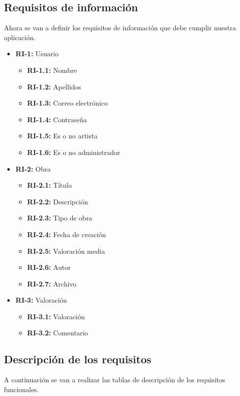 \subsection{Requisitos de información}
Ahora se van a definir los requisitos de información que debe cumplir nuestra
aplicación.

\begin{itemize}
    \item \textbf{RI-1:} Usuario
    \begin{itemize}
        \item \textbf{RI-1.1:} Nombre
        \item \textbf{RI-1.2:} Apellidos
        \item \textbf{RI-1.3:} Correo electrónico
        \item \textbf{RI-1.4:} Contraseña
        \item \textbf{RI-1.5:} Es o no artista
        \item \textbf{RI-1.6:} Es o no administrador
    \end{itemize}
    \item \textbf{RI-2:} Obra
    \begin{itemize}
        \item \textbf{RI-2.1:} Título
        \item \textbf{RI-2.2:} Descripción
        \item \textbf{RI-2.3:} Tipo de obra
        \item \textbf{RI-2.4:} Fecha de creación
        \item \textbf{RI-2.5:} Valoración media
        \item \textbf{RI-2.6:} Autor
        \item \textbf{RI-2.7:} Archivo
    \end{itemize}
    \item \textbf{RI-3:} Valoración
    \begin{itemize}
        \item \textbf{RI-3.1:} Valoración
        \item \textbf{RI-3.2:} Comentario
    \end{itemize}
\end{itemize}

\subsection{Descripción de los requisitos}
A continuación se van a realizar las tablas de descripción de los requisitos funcionales.

